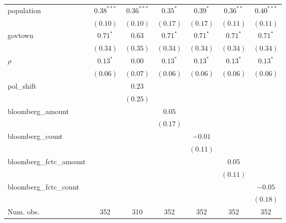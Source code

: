 \begin{table}[!h]
\begin{center}
\begin{tabular}{l c c c c c c }
population              & $0.38^{***}$ & $0.36^{***}$  & $0.35^{*}$   & $0.39^{*}$   & $0.36^{**}$  & $0.40^{***}$ \\
                        & $(0.10)$     & $(0.10)$      & $(0.17)$     & $(0.17)$     & $(0.11)$     & $(0.11)$     \\
govtown                 & $0.71^{*}$   & $0.63$        & $0.71^{*}$   & $0.71^{*}$   & $0.71^{*}$   & $0.71^{*}$   \\
                        & $(0.34)$     & $(0.35)$      & $(0.34)$     & $(0.34)$     & $(0.34)$     & $(0.34)$     \\
$\rho$                  & $0.13^{*}$   & $0.00$        & $0.13^{*}$   & $0.13^{*}$   & $0.13^{*}$   & $0.13^{*}$   \\
                        & $(0.06)$     & $(0.07)$      & $(0.06)$     & $(0.06)$     & $(0.06)$     & $(0.06)$     \\
pol\_shift              &              & $0.23$        &              &              &              &              \\
                        &              & $(0.25)$      &              &              &              &              \\
bloomberg\_amount       &              &               & $0.05$       &              &              &              \\
                        &              &               & $(0.17)$     &              &              &              \\
bloomberg\_count        &              &               &              & $-0.01$      &              &              \\
                        &              &               &              & $(0.11)$     &              &              \\
bloomberg\_fctc\_amount &              &               &              &              & $0.05$       &              \\
                        &              &               &              &              & $(0.11)$     &              \\
bloomberg\_fctc\_count  &              &               &              &              &              & $-0.05$      \\
                        &              &               &              &              &              & $(0.18)$     \\
\midrule
Num. obs.               & 352          & 310           & 352          & 352          & 352          & 352          \\

\end{tabular}
\end{center}
\end{table}
